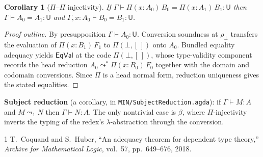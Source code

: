 \documentclass[11pt]{article}
\newcommand{\hastype}[3]{#1 \vdash #2 : #3}
\newcommand{\conveq}[4]{#1 \vdash #2 = #3 : #4}
\newcommand{\Pitype}[2]{\Pi(#1)\,#2}
\newcommand{\U}{\mathsf{U}}
\newcommand{\Red}{\mathrel{\leadsto^{*}}}
\newcommand{\Bot}{\bot}
\newcommand{\PiC}[2]{\Pi(#1,#2)}        %
\newcommand{\EqVal}{\mathsf{EqVal}}
\theoremstyle{plain}
\newtheorem{corollary}{Corollary}
\theoremstyle{definition}
\begin{document}
\begin{corollary}[$\Pi$--$\Pi$ injectivity]
  If $\conveq{\Gamma}{\Pitype{x{:}A_0}{B_0}}{\Pitype{x{:}A_1}{B_1}}{\U}$ then
  $\conveq{\Gamma}{A_0}{A_1}{\U}$ and
  $\conveq{\Gamma, x{:}A_0}{B_0}{B_1}{\U}$.
\end{corollary}

\begin{proof}[Proof outline]
  By presupposition $\hastype{\Gamma}{A_0}{\U}$.  Conversion soundness at
  $\rho_\bot$ transfers the evaluation of $\Pitype{x{:}B_1}{F_1}$ to
  $\PiC{\Bot}{[\,]}$ onto $A_0$.  Bundled equality adequacy yields $\EqVal$ at
  the code $\PiC{\Bot}{[\,]}$, whose type-validity component records the head
  reduction $A_0 \Red \Pitype{x{:}B_0}{F_0}$ together with the domain and
  codomain conversions.  Since $\Pi$ is a head normal form, reduction
  uniqueness gives the stated equalities.
\end{proof}

\medskip\noindent\textbf{Subject reduction} (a corollary, in
\texttt{MIN/SubjectReduction.agda}): if $\hastype{\Gamma}{M}{A}$ and
$M \leadsto_1 N$ then $\hastype{\Gamma}{N}{A}$.  The only nontrivial case is
$\beta$, where $\Pi$-injectivity inverts the typing of the redex's
$\lambda$-abstraction through the conversion.

\begin{thebibliography}{1}
  T.~Coquand and S.~Huber,
  ``An adequacy theorem for dependent type theory,''
  \emph{Archive for Mathematical Logic}, vol.~57, pp.~649--676, 2018.
\end{thebibliography}
\end{document}
